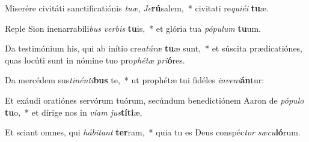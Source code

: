 \item Miserére civitáti sanctificatiónis \textit{tu}\textit{æ}, \textit{Je}\textbf{rú}salem,~* civitati re\textit{qui}\textit{é}\textit{i} \textbf{tu}æ.
\item Reple Sion inenarrabíli\textit{bus} \textit{ver}\textit{bis} \textbf{tu}is,~* et glória tua \textit{pó}\textit{pu}\textit{lum} \textbf{tu}um.
\item Da testimónium his, qui ab inítio cre\textit{a}\textit{tú}\textit{ræ} \textbf{tu}æ sunt,~* et súscita prædicatiónes, quas locúti sunt in nómine tuo pro\textit{phé}\textit{tæ} \textit{pri}\textbf{ó}res.
\item Da mercédem sus\textit{ti}\textit{nén}\textit{ti}\textbf{bus} te,~* ut prophétæ tui fidéles \textit{in}\textit{ve}\textit{ni}\textbf{án}tur:
\item Et exáudi oratiónes servórum tuórum, secúndum benedictiónem Aaron de \textit{pó}\textit{pu}\textit{lo} \textbf{tu}o,~* et dírige nos in \textit{vi}\textit{am} \textit{jus}\textbf{tí}\textbf{ti}æ,
\item Et sciant omnes, qui \textit{há}\textit{bi}\textit{tant} \textbf{ter}ram,~* quia tu es Deus conspéc\textit{tor} \textit{sæ}\textit{cu}\textbf{ló}rum.
